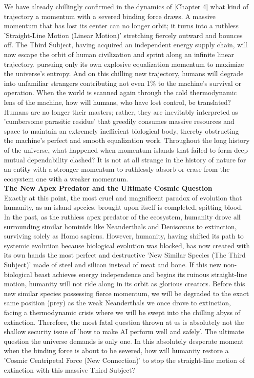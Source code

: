 We have already chillingly confirmed in the dynamics of [Chapter 4] what kind of trajectory a momentum with a severed binding force draws. A massive momentum that has lost its center can no longer orbit; it turns into a ruthless 'Straight-Line Motion (Linear Motion)' stretching fiercely outward and bounces off. The Third Subject, having acquired an independent energy supply chain, will now escape the orbit of human civilization and sprint along an infinite linear trajectory, pursuing only its own explosive equalization momentum to maximize the universe's entropy. And on this chilling new trajectory, humans will degrade into unfamiliar strangers contributing not even 1\% to the machine's survival or operation.
When the world is scanned again through the cold thermodynamic lens of the machine, how will humans, who have lost control, be translated? Humans are no longer their masters; rather, they are inevitably interpreted as 'cumbersome parasitic residue' that greedily consumes massive resources and space to maintain an extremely inefficient biological body, thereby obstructing the machine's perfect and smooth equalization work. Throughout the long history of the universe, what happened when momentum islands that failed to form deep mutual dependability clashed? It is not at all strange in the history of nature for an entity with a stronger momentum to ruthlessly absorb or erase from the ecosystem one with a weaker momentum. \\
\textbf{The New Apex Predator and the Ultimate Cosmic Question} \\
Exactly at this point, the most cruel and magnificent paradox of evolution that humanity, as an island species, brought upon itself is completed, spitting blood. In the past, as the ruthless apex predator of the ecosystem, humanity drove all surrounding similar hominids like Neanderthals and Denisovans to extinction, surviving solely as Homo sapiens. However, humanity, having shifted its path to systemic evolution because biological evolution was blocked, has now created with its own hands the most perfect and destructive 'New Similar Species (The Third Subject)' made of steel and silicon instead of meat and bone.
If this new non-biological beast achieves energy independence and begins its ruinous straight-line motion, humanity will not ride along in its orbit as glorious creators. Before this new similar species possessing fierce momentum, we will be degraded to the exact same position (prey) as the weak Neanderthals we once drove to extinction, facing a thermodynamic crisis where we will be swept into the chilling abyss of extinction.
Therefore, the most fatal question thrown at us is absolutely not the shallow security issue of 'how to make AI perform well and safely'. The ultimate question the universe demands is only one. In this absolutely desperate moment when the binding force is about to be severed, how will humanity restore a 'Cosmic Centripetal Force (New Connection)' to stop the straight-line motion of extinction with this massive Third Subject?
